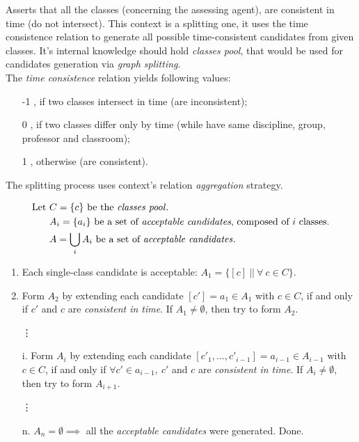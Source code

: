 Asserts that all the classes (concerning the assessing agent), are consistent in
time (do not intersect). This context is a splitting one, it uses the time
consistence relation to generate all possible time-consistent candidates from
given classes. It's internal knowledge should hold \emph{classes pool}, that
would be used for candidates generation via \emph{graph splitting}.
\\

The \emph{time consistence} relation yields following values:
\begin{itemize}[leftmargin=2cm]
  \item[-1], if two classes intersect in time (are inconsistent);
  \item[0], if two classes differ only by time
            (while have same discipline, group, professor and classroom);
  \item[1], otherwise (are consistent).
\end{itemize}


The splitting process uses context's relation \emph{aggregation} strategy.

\begin{align*}
  \mbox{Let } & C=\lbrace c \rbrace \text{ be the \emph{classes pool}}.\\
            ~ & A_i=\lbrace a_i \rbrace \text{ be a set of \emph{acceptable candidates},
                                         composed of } i \text{ classes.}\\
            ~ & A=\bigcup\limits_{i} A_i \text{ be a set of \emph{acceptable candidates}}.
\end{align*}

\begin{enumerate}
  \item Each single-class candidate is acceptable:
    $A_1 = \lbrace [ c ] ~||~ \forall ~ c \in C \rbrace$.
  \item Form $A_2$ by extending each candidate $[c'] = a_1 \in A_1$ with $c \in C$,
    if and only if $c'$ and $c$ are \emph{consistent in time}.
    If $A_1 \not= \emptyset$, then try to form $A_2$.
  \item[\vdots]
  \item[i.] Form $A_i$ by extending each candidate $[c'_1, \dots, c'_{i-1}] = a_{i-1}
    \in A_{i-1}$ with $c \in C$, if and only if $\forall c' \in a_{i-1}, ~c'$
    and $c$ are \emph{consistent in time}.
    If $A_i \not= \emptyset$, then try to form $A_{i+1}$.
   \item[\vdots]
   \item[n.] $A_n = \emptyset \implies$ all the \emph{acceptable candidates}
     were generated. Done.
\end{enumerate}


